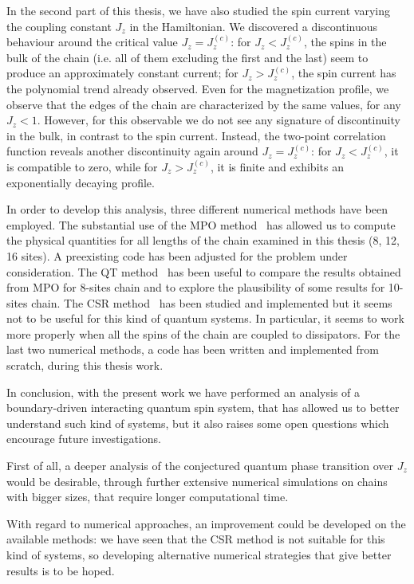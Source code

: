 In the second part of this thesis, we have also studied the spin current varying the coupling constant $J_z$ in the Hamiltonian. We discovered a discontinuous behaviour around the critical value $J_z = J_z^{(c)}$: for $J_z < J_z^{(c)}$, %
the spins in the bulk of the chain (i.e. all of them excluding the first and the last) seem to produce an approximately constant current; for $J_z > J_z^{(c)}$, the spin current has the polynomial trend already observed. Even for the magnetization profile, we observe that the edges of the chain are characterized by the same values, for any $J_z<1$. However, for this observable we do not see any signature of discontinuity in the bulk, in contrast to the spin current. Instead, the two-point correlation function reveals another discontinuity again around $J_z = J_z^{(c)}$: for $J_z < J_z^{(c)}$, it is compatible to zero, while for $J_z > J_z^{(c)}$, it is finite and exhibits an exponentially decaying profile.

In order to develop this analysis, three different numerical methods have been employed.  The substantial use of the MPO method~\cite{MPO_method} has allowed us to compute the physical quantities for all lengths of the chain examined in this thesis (8, 12, 16 sites). A preexisting code has been adjusted for the problem under consideration. The QT method~\cite{PhysRevLett.68.580} has been useful to compare the results obtained from MPO for 8-sites chain and to explore the plausibility of some results for 10-sites chain. The CSR method~\cite{PhysRevLett.115.080604} has been studied and implemented but it seems not to be useful for this kind of quantum systems. In particular, it seems to work more properly when all the spins of the chain are coupled to dissipators. For the last two numerical methods, a code has been written and implemented from scratch, during this thesis work.

In conclusion, with the present work we have performed an analysis of a boundary-driven interacting quantum spin system, that
has allowed us to better understand such kind of systems, but it also raises some open questions which encourage future investigations.

First of all, a deeper analysis of the conjectured quantum phase transition over $J_z$ would be desirable, through further extensive numerical simulations on chains with bigger sizes, that require longer computational time.

With regard to numerical approaches, an improvement could be developed on the available methods: we have seen that the CSR method is not suitable for this kind of systems, so developing alternative numerical strategies that give better results is to be hoped.

